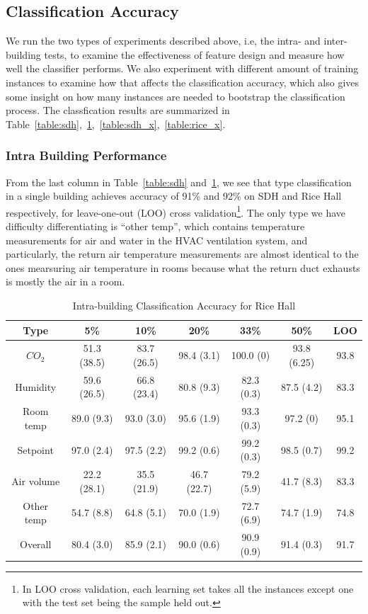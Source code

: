 \subsection{Classification Accuracy}
We run the two types of experiments described above, i.e, the intra- and inter- building tests, to examine the effectiveness of feature design and measure how well 
the classifier performs. We also experiment with different amount of training instances to examine how that affects the classification accuracy, which also gives 
some insight on how many instances are needed to bootstrap the classification process. The classfication results are summarized in Table~\ref{table:sdh},~\ref{table:rice},~\ref{table:sdh_x},~\ref{table:rice_x}.

\subsubsection{Intra Building Performance}
From the last column in Table~\ref{table:sdh} and~\ref{table:rice}, we see that type classification in a single building achieves accuracy of 91\% and 92\% on SDH and Rice Hall respectively, for leave-one-out (LOO) cross validation\footnote{In LOO cross validation, each learning set takes all the instances except one with the test set being the sample held out.}. The only type we have difficulty differentiating is ``other temp'', which contains temperature measurements for air and water in the HVAC ventilation system, and particularly, the return air temperature measurements are almost identical to the ones mearsuring air temperature in rooms because what the return duct exhausts is mostly the air in a room.

\begin{table}[ht!]
\caption{Intra-building Classification Accuracy for Rice Hall}
\centering %
\begin{tabular}{c | c | c | c | c | c | c}%
\hline %
Type & 5\% & 10\% & 20\% & 33\% & 50\% & LOO\\ %
\hline\hline %
$CO_{2}$ & 51.3 (38.5) & 83.7 (26.5) & 98.4 (3.1) & 100.0 (0) & 93.8 (6.25) & 93.8\\ \hline
Humidity & 59.6 (26.5) & 66.8 (23.4) & 80.8 (9.3) & 82.3 (0.3) & 87.5 (4.2) & 83.3\\ \hline
Room temp & 89.0 (9.3) & 93.0 (3.0) & 95.6 (1.9) & 93.3 (0.3) & 97.2 (0) & 95.1\\ \hline
Setpoint & 97.0 (2.4) & 97.5 (2.2) & 99.2 (0.6) & 99.2 (0.3) & 98.5 (0.7) & 99.2\\ \hline
Air volume & 22.2 (28.1) & 35.5 (21.9) & 46.7 (22.7) & 79.2 (5.9) & 41.7 (8.3) & 83.3\\ \hline
Other temp & 54.7 (8.8) & 64.8 (5.1) & 70.0 (1.9) & 72.7 (6.9) & 74.7 (1.9) & 74.8\\ \hline
Overall & 80.4 (3.0) & 85.9 (2.1) & 90.0 (0.6) & 90.9 (0.9) & 91.4 (0.3) & 91.7\\ \hline
\end{tabular}
\label{table:rice} %
\end{table}

